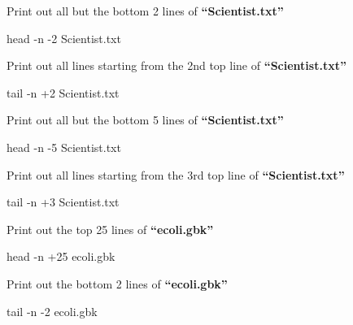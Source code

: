 \documentclass[
  letterpaper,
  DIV=11,
  numbers=noendperiod]{scrreprt}
\newenvironment{Shaded}{\begin{snugshade}}{\end{snugshade}}
\newcommand{\AttributeTok}[1]{\textcolor[rgb]{0.40,0.45,0.13}{#1}}
\newcommand{\FunctionTok}[1]{\textcolor[rgb]{0.28,0.35,0.67}{#1}}
\newcommand{\NormalTok}[1]{\textcolor[rgb]{0.00,0.23,0.31}{#1}}
\begin{document}
Print out all but the bottom 2 lines of \textbf{``Scientist.txt''}

\begin{Shaded}
\begin{Highlighting}[]
\FunctionTok{head} \AttributeTok{{-}n} \AttributeTok{{-}2}\NormalTok{ Scientist.txt}
\end{Highlighting}
\end{Shaded}

Print out all lines starting from the 2nd top line of
\textbf{``Scientist.txt''}

\begin{Shaded}
\begin{Highlighting}[]
\FunctionTok{tail} \AttributeTok{{-}n}\NormalTok{ +2 Scientist.txt}
\end{Highlighting}
\end{Shaded}

Print out all but the bottom 5 lines of \textbf{``Scientist.txt''}

\begin{Shaded}
\begin{Highlighting}[]
\FunctionTok{head} \AttributeTok{{-}n} \AttributeTok{{-}5}\NormalTok{ Scientist.txt}
\end{Highlighting}
\end{Shaded}

Print out all lines starting from the 3rd top line of
\textbf{``Scientist.txt''}

\begin{Shaded}
\begin{Highlighting}[]
\FunctionTok{tail} \AttributeTok{{-}n}\NormalTok{ +3 Scientist.txt}
\end{Highlighting}
\end{Shaded}

Print out the top 25 lines of \textbf{``ecoli.gbk''}

\begin{Shaded}
\begin{Highlighting}[]
\FunctionTok{head} \AttributeTok{{-}n}\NormalTok{ +25 ecoli.gbk}
\end{Highlighting}
\end{Shaded}

Print out the bottom 2 lines of \textbf{``ecoli.gbk''}

\begin{Shaded}
\begin{Highlighting}[]
\FunctionTok{tail} \AttributeTok{{-}n} \AttributeTok{{-}2}\NormalTok{ ecoli.gbk}
\end{Highlighting}
\end{Shaded}
\end{document}
